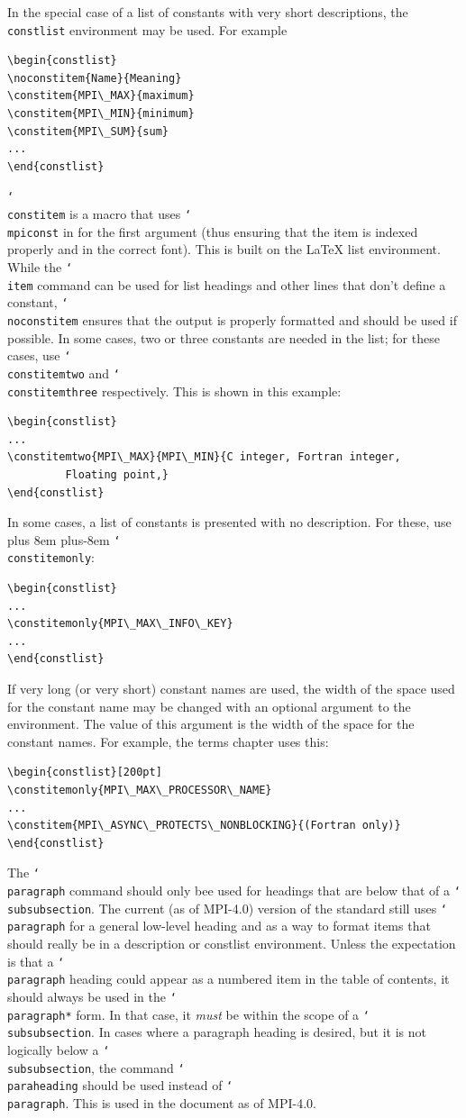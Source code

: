\documentclass[letterpaper,twoside,11pt,fleqn]{article}
\def\cmd#1{\texttt{\char`\\#1}}
\def\MPIIVDOTO/{\textsf{MPI-4.0}}
\def\gb{\penalty10000\hskip 0pt plus 8em\penalty4800\hskip 0pt plus-8em%
\penalty10000}
\begin{document}
In the special case of a list of constants with very short
descriptions, the \texttt{constlist} environment may be used.
For example
\begin{verbatim}
\begin{constlist}
\noconstitem{Name}{Meaning}
\constitem{MPI\_MAX}{maximum}
\constitem{MPI\_MIN}{minimum}
\constitem{MPI\_SUM}{sum}
...
\end{constlist}
\end{verbatim}
\cmd{constitem} is a macro that uses \cmd{mpiconst} in for the first
argument (thus ensuring that the item is indexed properly and in the
correct font). This is built on the LaTeX list environment.
While the \cmd{item} command can be used for list headings and other
lines that don't define a constant, \cmd{noconstitem} ensures that the
output is properly formatted and should be used if possible.
In some cases, two or three constants are needed in the list; for
these cases, use \cmd{constitemtwo} and \cmd{constitemthree}
respectively.
This is shown in this example:
\begin{verbatim}
\begin{constlist}
...
\constitemtwo{MPI\_MAX}{MPI\_MIN}{C integer, Fortran integer,
         Floating point,}
\end{constlist}
\end{verbatim}
In some cases, a list of constants is presented with no description.
For these, use \gb\cmd{constitemonly}:
\begin{verbatim}
\begin{constlist}
...
\constitemonly{MPI\_MAX\_INFO\_KEY}
...
\end{constlist}
\end{verbatim}
If very long (or very short) constant names are used, the width of the
space used for the constant name may be changed with an optional
argument to the environment.  The value of this argument is the width
of the space for the constant names.
For example, the terms chapter uses this:
\begin{verbatim}
\begin{constlist}[200pt]
\constitemonly{MPI\_MAX\_PROCESSOR\_NAME}
...
\constitem{MPI\_ASYNC\_PROTECTS\_NONBLOCKING}{(Fortran only)}
\end{constlist}
\end{verbatim}

The \cmd{paragraph} command should only bee used for headings that are
below that of a \cmd{subsubsection}.
The current (as of \MPIIVDOTO/) version of the standard still uses
\cmd{paragraph} for a general low-level heading and as a way to format
items that should really be in a description or constlist
environment.
Unless the expectation is that a \cmd{paragraph} heading could appear
as a numbered item in the table of contents, it should always be used
in the \cmd{paragraph*} form.
In that case, it \emph{must} be within the scope of a
\cmd{subsubsection}.
In cases where a paragraph heading is desired, but it is not logically
below a \cmd{subsubsection}, the command \cmd{paraheading} should be
used instead of \cmd{paragraph}. This is used in the document as of
\MPIIVDOTO/.
\end{document}
